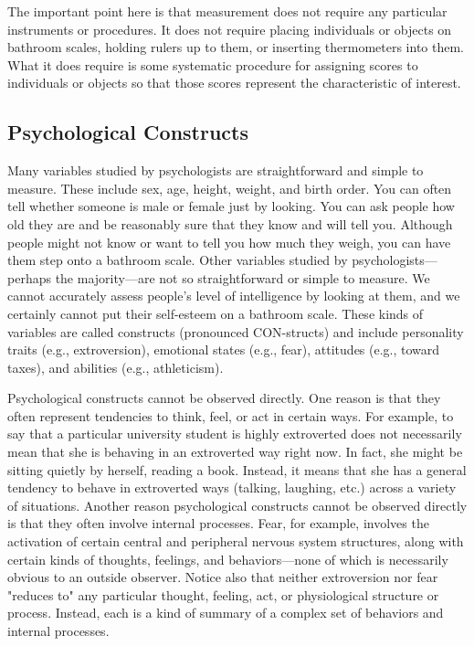 The important point here is that measurement does not require any particular instruments or procedures. It does not require placing individuals or objects on bathroom scales, holding rulers up to them, or inserting thermometers into them. What it does require is some systematic procedure for assigning scores to individuals or objects so that those scores represent the characteristic of interest.
  


\subsection{Psychological Constructs}


Many variables studied by psychologists are straightforward and simple to measure. These include sex, age, height, weight, and birth order. You can often tell whether someone is male or female just by looking. You can ask people how old they are and be reasonably sure that they know and will tell you. Although people might not know or want to tell you how much they weigh, you can have them step onto a bathroom scale. Other variables studied by psychologists—perhaps the majority—are not so straightforward or simple to measure. We cannot accurately assess people's level of intelligence by looking at them, and we certainly cannot put their self-esteem on a bathroom scale. These kinds of variables are called constructs (pronounced CON-structs) and include personality traits (e.g., extroversion), emotional states (e.g., fear), attitudes (e.g., toward taxes), and abilities (e.g., athleticism).


Psychological constructs cannot be observed directly. One reason is that they often represent tendencies to think, feel, or act in certain ways. For example, to say that a particular university student is highly extroverted does not necessarily mean that she is behaving in an extroverted way right now. In fact, she might be sitting quietly by herself, reading a book. Instead, it means that she has a general tendency to behave in extroverted ways (talking, laughing, etc.) across a variety of situations. Another reason psychological constructs cannot be observed directly is that they often involve internal processes. Fear, for example, involves the activation of certain central and peripheral nervous system structures, along with certain kinds of thoughts, feelings, and behaviors—none of which is necessarily obvious to an outside observer. Notice also that neither extroversion nor fear "reduces to" any particular thought, feeling, act, or physiological structure or process. Instead, each is a kind of summary of a complex set of behaviors and internal processes.


